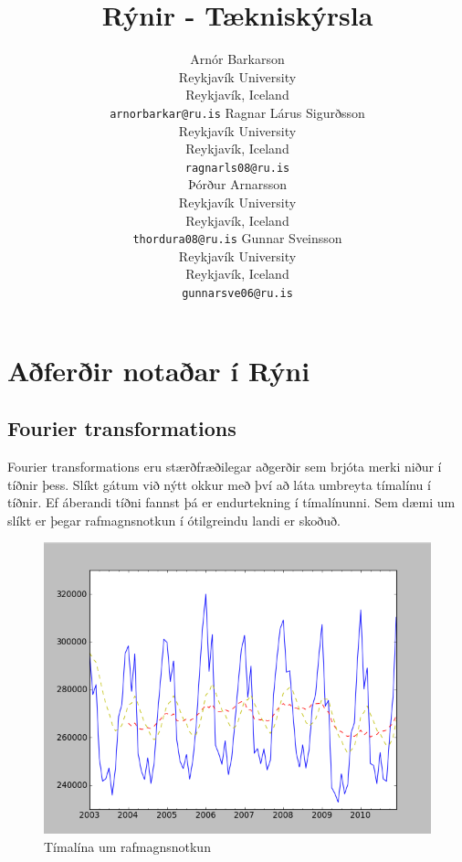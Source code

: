 \documentclass[11pt]{article}
\title{Rýnir - Tækniskýrsla}
\author{Arnór Barkarson\\
  Reykjavík University\\
  Reykjavík, Iceland\\
  {\tt arnorbarkar@ru.is}  \And  
  Ragnar Lárus Sigurðsson\\
  Reykjavík University\\
  Reykjavík, Iceland\\
  {\tt  ragnarls08@ru.is}\\ \And 
  Þórður Arnarsson\\
  Reykjavík University\\
  Reykjavík, Iceland\\
  {\tt  thordura08@ru.is}  \And 
  Gunnar Sveinsson\\
  Reykjavík University\\
  Reykjavík, Iceland\\
  {\tt  gunnarsve06@ru.is} 
}
\date{}
\begin{document}
\maketitle

\section{Aðferðir notaðar í Rýni}
\subsection{Fourier transformations}
Fourier transformations eru stærðfræðilegar aðgerðir sem brjóta merki niður í tíðnir þess. Slíkt gátum við nýtt okkur með því að láta umbreyta 
tímalínu í tíðnir. Ef áberandi tíðni fannst þá er endurtekning í tímalínunni. Sem dæmi um slíkt er þegar 
rafmagnsnotkun í ótilgreindu landi er skoðuð.\\
\begin{figure}
 \begin{center}
 \includegraphics[width=.45\textwidth]{Rafmagnsnotkun.png}
 \caption{Tímalína um rafmagnsnotkun}
  \end{center}
\end{figure}
\hfill
\\\\\\\\\\\\\\\\\\\\\\\\\\\\\\\
\end{document}

